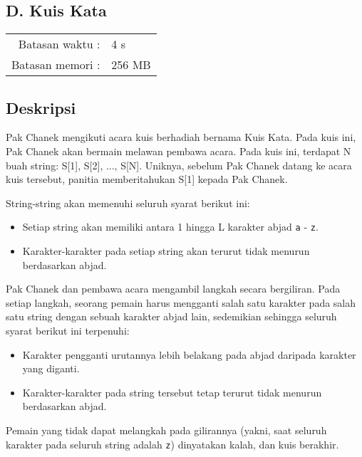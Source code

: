 \documentclass[../main_problemset.tex]{subfiles} %
\newcommand{\problemName}{D. Kuis Kata}
\newcommand{\problemTL}{4 s}
\newcommand{\problemML}{256 MB}
\begin{document}
\begin{center}
    \section*{\problemName}
    \addcontentsline{toc}{section}{\problemName} %
    
    \begin{tabular}{rl}
    Batasan waktu : & \problemTL \\
    Batasan memori : & \problemML
    \end{tabular}
\end{center}

\subsection*{Deskripsi}

Pak Chanek mengikuti acara kuis berhadiah bernama Kuis Kata. Pada kuis ini, Pak Chanek akan bermain melawan pembawa acara. Pada kuis ini, terdapat N buah string: S[1], S[2], ..., S[N]. Uniknya, sebelum Pak Chanek datang ke acara kuis tersebut, panitia memberitahukan S[1] kepada Pak Chanek.

String-string akan memenuhi seluruh syarat berikut ini:

\begin{itemize}
	\item Setiap string akan memiliki antara 1 hingga L karakter abjad \texttt{a} - \texttt{z}.
	\item Karakter-karakter pada setiap string akan terurut tidak menurun berdasarkan abjad.
\end{itemize}

Pak Chanek dan pembawa acara mengambil langkah secara bergiliran. Pada setiap langkah, seorang pemain harus mengganti salah satu karakter pada salah satu string dengan sebuah karakter abjad lain, sedemikian sehingga seluruh syarat berikut ini terpenuhi:

\begin{itemize}
	\item Karakter pengganti urutannya lebih belakang pada abjad daripada karakter yang diganti.
	\item Karakter-karakter pada string tersebut tetap terurut tidak menurun berdasarkan abjad.
\end{itemize}

Pemain yang tidak dapat melangkah pada gilirannya (yakni, saat seluruh karakter pada seluruh string adalah \texttt{z}) dinyatakan kalah, dan kuis berakhir.
\end{document}
